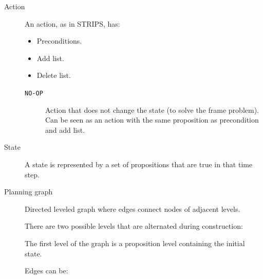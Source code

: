 \begin{description}
    \item[Action] 
        An action, as in STRIPS, has:
        \begin{itemize}
            \item Preconditions.
            \item Add list.
            \item Delete list.
        \end{itemize}

        \begin{description}
            \item[\texttt{NO-OP}] 
                Action that does not change the state (to solve the frame problem).
                Can be seen as an action with the same proposition as precondition and add list.
        \end{description}

    \item[State] 
        A state is represented by a set of propositions that are true in that time step.

    \item[Planning graph] 
        Directed leveled graph where edges connect nodes of adjacent levels.

        There are two possible levels that are alternated during construction:
        The first level of the graph is a proposition level containing the initial state.

        Edges can be:


\end{description}
